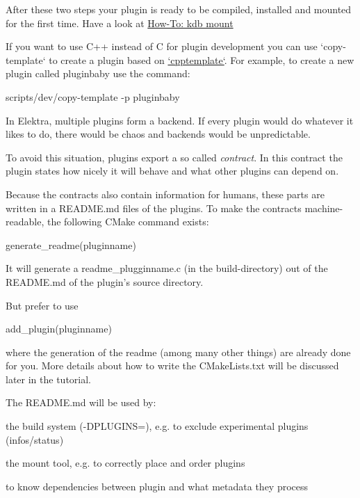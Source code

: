 After these two steps your plugin is ready to be compiled, installed and mounted for the first time. Have a look at \hyperlink{doc_tutorials_mount_md}{How-\/\+To\+: kdb mount}

If you want to use C++ instead of C for plugin development you can use `copy-\/template` to create a plugin based on \hyperlink{autotoc_md106_src_plugins_cpptemplate_README_md}{`cpptemplate`}. For example, to create a new plugin called {\ttfamily pluginbaby} use the command\+:


\begin{DoxyCode}
scripts/dev/copy-template -p pluginbaby
\end{DoxyCode}


In Elektra, multiple plugins form a backend. If every plugin would do whatever it likes to do, there would be chaos and backends would be unpredictable.

To avoid this situation, plugins export a so called {\itshape contract}. In this contract the plugin states how nicely it will behave and what other plugins can depend on.

Because the contracts also contain information for humans, these parts are written in a {\ttfamily R\+E\+A\+D\+M\+E.\+md} files of the plugins. To make the contracts machine-\/readable, the following C\+Make command exists\+:


\begin{DoxyCode}
generate\_readme(pluginname)
\end{DoxyCode}


It will generate a {\ttfamily readme\+\_\+plugginname.\+c} (in the build-\/directory) out of the {\ttfamily R\+E\+A\+D\+M\+E.\+md} of the plugin’s source directory.

But prefer to use


\begin{DoxyCode}
add\_plugin(pluginname)
\end{DoxyCode}


where the generation of the readme (among many other things) are already done for you. More details about how to write the {\ttfamily C\+Make\+Lists.\+txt} will be discussed later in the tutorial.

The {\ttfamily R\+E\+A\+D\+M\+E.\+md} will be used by\+:


\begin{DoxyItemize}
\item the build system ({\ttfamily -\/\+D\+P\+L\+U\+G\+I\+NS=}), e.\+g. to exclude experimental plugins ({\ttfamily infos/status})
\item the mount tool, e.\+g. to correctly place and order plugins
\item to know dependencies between plugin and what metadata they process
\end{DoxyItemize}

